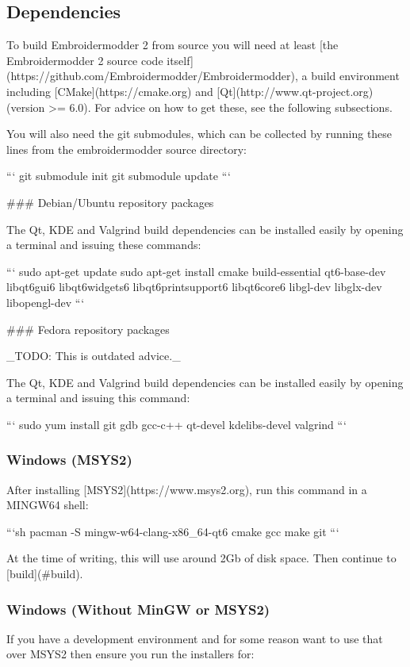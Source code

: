 \subsection{Dependencies}

To build Embroidermodder 2 from source you will need at least
[the Embroidermodder 2 source code itself](https://github.com/Embroidermodder/Embroidermodder),
a build environment including [CMake](https://cmake.org) and [Qt](http://www.qt-project.org) (version >= 6.0). For advice on how to get these,
see the following subsections.

You will also need the git submodules, which can be collected by running these lines
from the embroidermodder source directory:

```
git submodule init
git submodule update
```

### Debian/Ubuntu repository packages

The Qt, KDE and Valgrind build dependencies can be installed easily by
opening a terminal and issuing these commands:

```
sudo apt-get update
sudo apt-get install cmake build-essential qt6-base-dev libqt6gui6 libqt6widgets6 libqt6printsupport6 libqt6core6 libgl-dev libglx-dev libopengl-dev
```

### Fedora repository packages

_TODO: This is outdated advice._

The Qt, KDE and Valgrind build dependencies can be installed easily
by opening a terminal and issuing this command:

```
sudo yum install git gdb gcc-c++ qt-devel kdelibs-devel valgrind
```

\subsubsection{Windows (MSYS2)}

After installing [MSYS2](https://www.msys2.org), run this command in a MINGW64 shell:

```sh
pacman -S mingw-w64-clang-x86_64-qt6 cmake gcc make git
```

At the time of writing, this will use around 2Gb of disk space. Then continue to [build](#build).

\subsubsection{Windows (Without MinGW or MSYS2)}

If you have a development environment and for some reason want to use that over MSYS2 then ensure you run the installers for:

